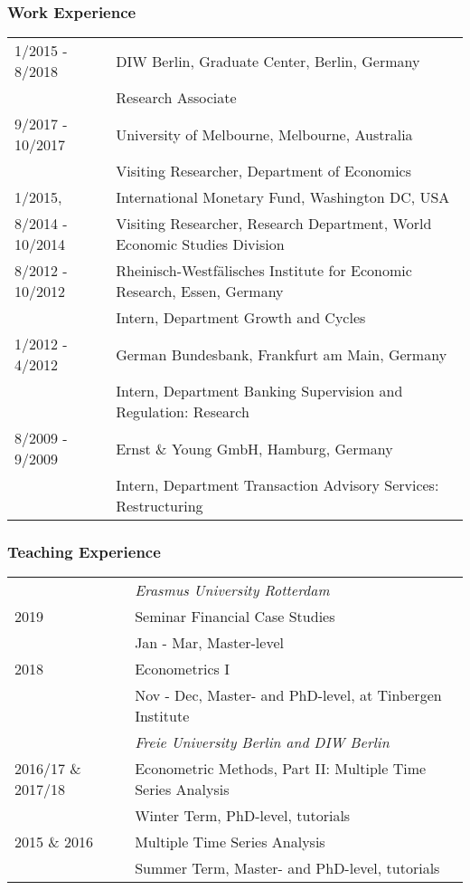 \documentclass[10pt,a4paper]{article}
\begin{document}
\subsubsection*{Work Experience}
\begin{tabular}{ p{3cm} | p{13cm}}
	1/2015 - 8/2018 & DIW Berlin, Graduate Center, Berlin, Germany \\
	& Research Associate\\ [0.1cm]
	9/2017 - 10/2017 & University of Melbourne, Melbourne, Australia \\
	& Visiting Researcher, Department of Economics\\ [0.1cm]
	1/2015, 	& International Monetary Fund, Washington DC, USA \\
	8/2014 - 10/2014 & Visiting Researcher, Research Department, World Economic Studies Division \\ [0.1cm]
	8/2012 - 10/2012 & Rheinisch-Westf\"alisches Institute for Economic Research, Essen, Germany \\ & Intern, Department Growth and Cycles \\ [0.1cm]
	1/2012 - 4/2012 & German Bundesbank, Frankfurt am Main, Germany \\ & Intern, Department Banking Supervision and Regulation: Research\\ [0.1cm]
	8/2009 - 9/2009 & Ernst \& Young GmbH, Hamburg, Germany \\ & Intern, Department Transaction Advisory Services: Restructuring 
\end{tabular}
\vspace{0.2cm}
\subsubsection*{Teaching Experience}
\begin{tabular}{ p{3cm} | p{13cm}}
& \textit{Erasmus University Rotterdam} \\[0.2cm]
2019 & Seminar Financial Case Studies \\ & Jan - Mar, Master-level \\ [0.1cm]
2018 & Econometrics I \\  & Nov - Dec, Master- and PhD-level, at Tinbergen Institute \\ [0.2cm]

& \textit{Freie University Berlin and DIW Berlin} \\[0.2cm]
	2016/17 \&  2017/18 & Econometric Methods, Part II: Multiple Time Series Analysis \\  & Winter Term, PhD-level, tutorials \\ [0.1cm]
	2015 \& 2016 & Multiple Time Series Analysis \\  & Summer Term, Master- and PhD-level, tutorials
\end{tabular}
\end{document}
